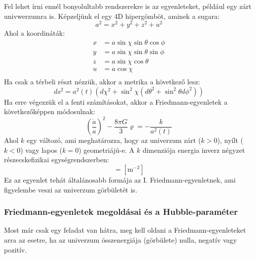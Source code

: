 \documentclass[../main.tex]{subfiles}
\begin{document}
Fel lehet írni ennél bonyolultabb rendszerekre is az egyenleteket, például egy zárt univwerzumra is. Képzeljünk el egy 4D hipergömböt, aminek a sugara:
\begin{equation}
    a^2 = x^2 + y^2 + z^2 + u^2
\end{equation}
Ahol a koordináták:
\begin{equation}
    \begin{aligned}
        x &= a \sin \chi \sin \theta \cos \phi \\
        y &= a \sin \chi \sin \theta \sin \phi \\
        z &= a \sin \chi \cos \theta \\
        u &= a \cos \chi \\
    \end{aligned}
\end{equation}
Ha csak a térbeli részt nézzük, akkor a metrika a következő lesz:
\begin{equation}
    ds^2 = a^2(t) \left(d \chi^2 + \sin^2 \chi (d \theta^2 + \sin^2 \theta d \phi^2)\right)
\end{equation}
Ha erre végezzük el a fenti számításokat, akkor a Friedmann-egyenletek a következőképpen módosulnak:
\begin{equation}
    \left(\frac{\dot{a}}{a}\right)^2 - \frac{8 \pi G}{3} \varrho = - \frac{k}{a^2(t)}
\end{equation}
Ahol $k$ egy változó, ami meghatározza, hogy az univerzum zárt ($k > 0$), nyílt ($k < 0$) vagy lapos ($k = 0$) geometriájú-e. A $k$ dimenziója energia inverz négyzet részecskefizikai egységrendszerben:
\begin{equation}
    [k] = [\text{m}^{-2}]
\end{equation}
Ez az egyenlet tehát általánosabb formája az I. Friedmann-egyenletnek, ami figyelembe veszi az univerzum görbületét is.

\subsubsection{Friedmann-egyenletek megoldásai és a Hubble-paraméter}
Most már csak egy feladat van hátra, meg kell oldani a Friedmann-egyenleteket arra az esetre, ha az univerzum összenergiája (görbülete) nulla, negatív vagy pozitív.
\end{document}
